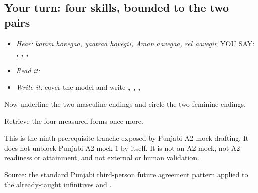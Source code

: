 \subsection*{Your turn: four skills, bounded to the two pairs}
\begin{itemize}
\raggedright
  \item \emph{Hear:} \emph{kamm hovegaa, yaatraa hovegii, Aman aavegaa, rel aavegii}; YOU SAY: \textbf{ ,  ,  ,  }
  \item \emph{Read it:} \textbf{       }
  \item \emph{Write it:} cover the model and write \textbf{, , , }
\end{itemize}

Now underline the two masculine endings and circle the two feminine endings.

\begin{tcolorbox}[breakable,colback=teal!4,colframe=teal!35!black,title={Before you move on}]
Retrieve the four measured forms once more.

This is the ninth prerequisite tranche exposed by Punjabi A2 mock drafting. It does not unblock Punjabi A2 mock 1 by itself. It is not an A2 mock, not A2 readiness or attainment, and not external or human validation.

Source: the standard Punjabi third-person future agreement pattern applied to the already-taught infinitives \textbf{} and \textbf{}.
\end{tcolorbox}
